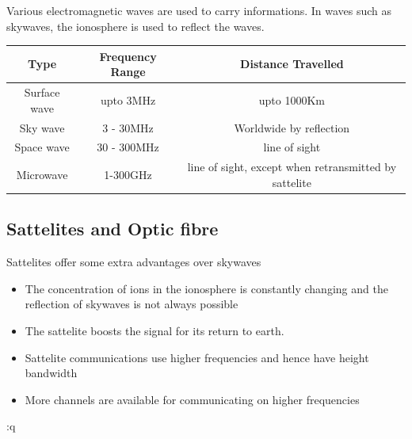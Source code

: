 \documentclass{scrbook}
\begin{document}
	Various electromagnetic waves are used to carry informations. In waves such as skywaves, the ionosphere is used to reflect the waves.

	\begin{tabular}{| c | c | c |}
		\hline
		Type & Frequency Range & Distance Travelled \\
		\hline
		Surface wave & upto 3MHz & upto 1000Km \\
		Sky wave & 3 - 30MHz & Worldwide by reflection \\
		Space wave & 30 - 300MHz & line of sight \\
		Microwave & 1-300GHz & line of sight, except when retransmitted by sattelite \\
		\hline
	\end{tabular}

\subsection{Sattelites and Optic fibre}

	Sattelites offer some extra advantages over skywaves

	\begin{itemize}
		\item
			The concentration of ions in the ionosphere is constantly changing and the reflection of skywaves is not always possible
		\item
			The sattelite boosts the signal for its return to earth.
		\item
			Sattelite communications use higher frequencies and hence have height bandwidth
		\item
			More channels are available for communicating on higher frequencies
	\end{itemize}:q


\printbibliography{}
\end{document}
